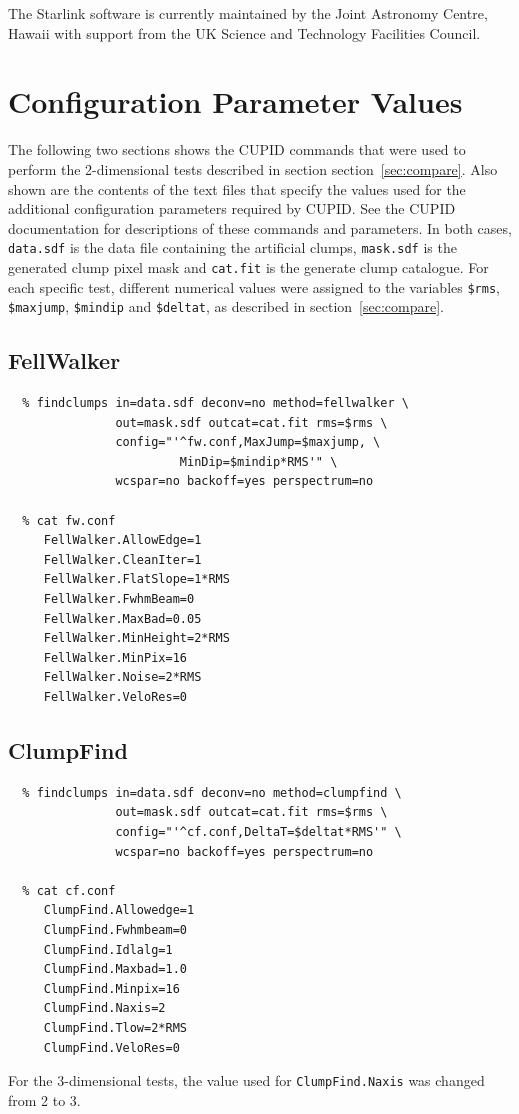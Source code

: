\documentclass[final,authoryear,5p,times,twocolumn]{elsarticle}
\begin{document}
The Starlink software is currently maintained by the Joint Astronomy
Centre, Hawaii with support from the UK Science and Technology
Facilities Council.


\appendix

\section{Configuration Parameter Values}
\label{app:configs}
The following two sections shows the CUPID commands that were
used to perform the 2-dimensional tests described in section
section~\ref{sec:compare}. Also shown are the contents of the text files
that specify the values used for the additional configuration parameters
required by CUPID. See the CUPID documentation \citep{SUN255} for
descriptions of these commands and parameters. In both cases,
\texttt{data.sdf} is the data file containing the artificial clumps,
\texttt{mask.sdf} is the generated clump pixel mask and \texttt{cat.fit}
is the generate clump catalogue. For each specific test, different
numerical values were assigned to the variables \texttt{\$rms},
\texttt{\$maxjump}, \texttt{\$mindip} and \texttt{\$deltat}, as described
in section~\ref{sec:compare}.
\subsection{FellWalker}
{\small
\begin{verbatim}
  % findclumps in=data.sdf deconv=no method=fellwalker \
               out=mask.sdf outcat=cat.fit rms=$rms \
               config="'^fw.conf,MaxJump=$maxjump, \
                        MinDip=$mindip*RMS'" \
               wcspar=no backoff=yes perspectrum=no

  % cat fw.conf
     FellWalker.AllowEdge=1
     FellWalker.CleanIter=1
     FellWalker.FlatSlope=1*RMS
     FellWalker.FwhmBeam=0
     FellWalker.MaxBad=0.05
     FellWalker.MinHeight=2*RMS
     FellWalker.MinPix=16
     FellWalker.Noise=2*RMS
     FellWalker.VeloRes=0
\end{verbatim}
}
\subsection{ClumpFind}
{\small
\begin{verbatim}
  % findclumps in=data.sdf deconv=no method=clumpfind \
               out=mask.sdf outcat=cat.fit rms=$rms \
               config="'^cf.conf,DeltaT=$deltat*RMS'" \
               wcspar=no backoff=yes perspectrum=no

  % cat cf.conf
     ClumpFind.Allowedge=1
     ClumpFind.Fwhmbeam=0
     ClumpFind.Idlalg=1
     ClumpFind.Maxbad=1.0
     ClumpFind.Minpix=16
     ClumpFind.Naxis=2
     ClumpFind.Tlow=2*RMS
     ClumpFind.VeloRes=0
\end{verbatim}
}
For the 3-dimensional tests, the value used for \texttt{ClumpFind.Naxis}
was changed from 2 to 3.
\end{document}
